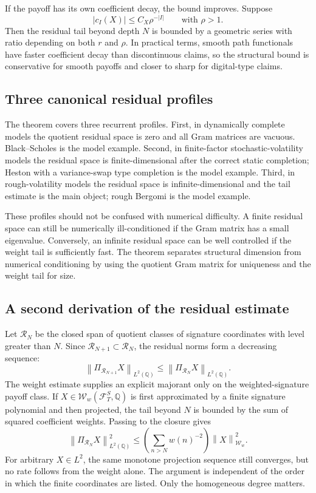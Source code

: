 \documentclass[11pt,oneside]{article}
\theoremstyle{plain}
\theoremstyle{definition}
\theoremstyle{remark}
\newcommand{\Q}{\mathbb{Q}}
\newcommand{\FS}{\mathcal F^S}
\newcommand{\norm}[1]{\left\lVert #1\right\rVert}
\newcommand{\abs}[1]{\left\lvert #1\right\rvert}
\begin{document}
If the payoff has its own coefficient decay, the bound improves. Suppose
\[
\abs{c_I(X)}\leq C_X\rho^{-|I|}
\qquad \text{with }\rho>1.
\]
Then the residual tail beyond depth $N$ is bounded by a geometric series with ratio depending on both $r$ and $\rho$. In practical terms, smooth path functionals have faster coefficient decay than discontinuous claims, so the structural bound is conservative for smooth payoffs and closer to sharp for digital-type claims.

\subsection{Three canonical residual profiles}
\label{subsec:canonical-residual-profiles}
The theorem covers three recurrent profiles. First, in dynamically complete models the quotient residual space is zero and all Gram matrices are vacuous. Black--Scholes is the model example. Second, in finite-factor stochastic-volatility models the residual space is finite-dimensional after the correct static completion; Heston with a variance-swap type completion is the model example. Third, in rough-volatility models the residual space is infinite-dimensional and the tail estimate is the main object; rough Bergomi is the model example.

These profiles should not be confused with numerical difficulty. A finite residual space can still be numerically ill-conditioned if the Gram matrix has a small eigenvalue. Conversely, an infinite residual space can be well controlled if the weight tail is sufficiently fast. The theorem separates structural dimension from numerical conditioning by using the quotient Gram matrix for uniqueness and the weight tail for size.



\subsection{A second derivation of the residual estimate}
\label{subsec:second-residual-derivation}
Let $\mathcal R_N$ be the closed span of quotient classes of signature coordinates with level greater than $N$. Since $\mathcal R_{N+1}\subset\mathcal R_N$, the residual norms form a decreasing sequence:
\[
\norm{\Pi_{\mathcal R_{N+1}}X}_{L^2(\Q)}
\leq
\norm{\Pi_{\mathcal R_N}X}_{L^2(\Q)}.
\]
The weight estimate supplies an explicit majorant only on the weighted-signature payoff class. If $X\in\mathcal W_w(\FS_T,\Q)$ is first approximated by a finite signature polynomial and then projected, the tail beyond $N$ is bounded by the sum of squared coefficient weights. Passing to the closure gives
\[
\norm{\Pi_{\mathcal R_N}X}_{L^2(\Q)}^2
\leq \left(\sum_{n>N}w(n)^{-2}\right)\norm{X}_{\mathcal W_w}^2 .
\]
For arbitrary $X\in L^2$, the same monotone projection sequence still converges, but no rate follows from the weight alone. The argument is independent of the order in which the finite coordinates are listed. Only the homogeneous degree matters.
\end{document}
